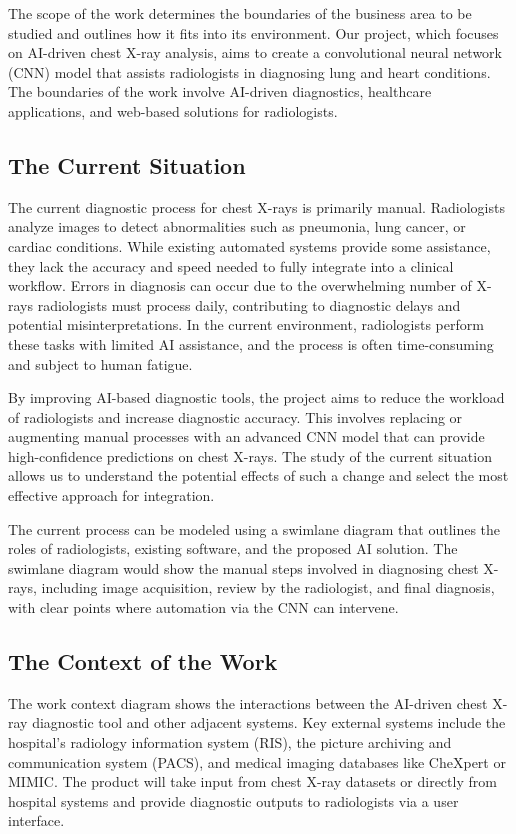 \documentclass[12pt]{article}
\begin{document}
The scope of the work determines the boundaries of the business area to be studied and outlines 
how it fits into its environment. Our project, which focuses on AI-driven chest X-ray analysis, 
aims to create a convolutional neural network (CNN) model that assists radiologists in diagnosing 
lung and heart conditions. The boundaries of the work involve AI-driven diagnostics, healthcare 
applications, and web-based solutions for radiologists.

\subsection{The Current Situation}
The current diagnostic process for chest X-rays is primarily manual. Radiologists analyze images 
to detect abnormalities such as pneumonia, lung cancer, or cardiac conditions. While existing 
automated systems provide some assistance, they lack the accuracy and speed needed to fully 
integrate into a clinical workflow. Errors in diagnosis can occur due to the overwhelming number
of X-rays radiologists must process daily, contributing to diagnostic delays and potential 
misinterpretations. In the current environment, radiologists perform these tasks with limited AI 
assistance, and the process is often time-consuming and subject to human fatigue.

By improving AI-based diagnostic tools, the project aims to reduce the workload of radiologists 
and increase diagnostic accuracy. This involves replacing or augmenting manual processes with an 
advanced CNN model that can provide high-confidence predictions on chest X-rays. The study of the 
current situation allows us to understand the potential effects of such a change and select the 
most effective approach for integration.

The current process can be modeled using a swimlane diagram that outlines the roles of 
radiologists, existing software, and the proposed AI solution. The swimlane diagram would show the 
manual steps involved in diagnosing chest X-rays, including image acquisition, review by the 
radiologist, and final diagnosis, with clear points where automation via the CNN can intervene.


\subsection{The Context of the Work}
The work context diagram shows the interactions between the AI-driven chest X-ray diagnostic tool 
and other adjacent systems. Key external systems include the hospital's radiology information 
system (RIS), the picture archiving and communication system (PACS), and medical imaging databases 
like CheXpert or MIMIC. The product will take input from chest X-ray datasets or directly from 
hospital systems and provide diagnostic outputs to radiologists via a user interface.
\end{document}
